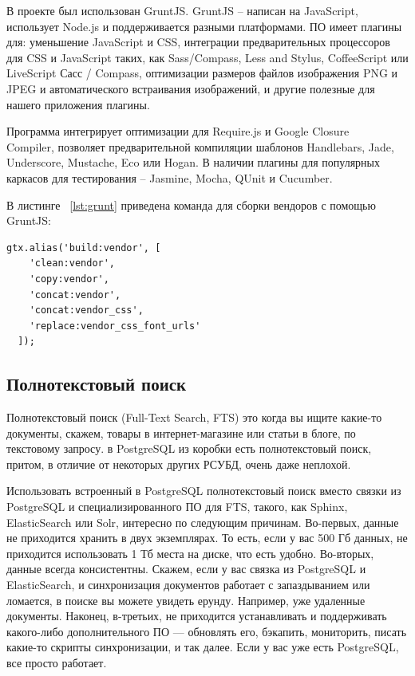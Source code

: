 В проекте был использован GruntJS. GruntJS – написан на JavaScript, использует Node.js
и поддерживается разными платформами. ПО имеет плагины для: уменьшение JavaScript и CSS,
интеграции предварительных процессоров для CSS и JavaScript таких, как Sass/Compass,
Less and Stylus, CoffeeScript или LiveScript Сасс / Compass, оптимизации размеров файлов
изображения PNG и JPEG и автоматического встраивания изображений, и другие полезные
для нашего приложения плагины.

Программа  интегрирует оптимизации для Require.js и
Google Closure\\ Compiler, позволяет предварительной компиляции шаблонов Handlebars,
Jade, Underscore, Mustache, Eco или Hogan. В наличии  плагины для популярных каркасов
для тестирования – Jasmine, Mocha, QUnit и Cucumber.

В листинге ~\ref{lst:grunt} приведена команда для сборки вендоров с помощью GruntJS:
\begin{lstlisting}[caption={Сборка вендоров}, label=lst:grunt]
  gtx.alias('build:vendor', [
    'clean:vendor',
    'copy:vendor',
    'concat:vendor',
    'concat:vendor_css',
    'replace:vendor_css_font_urls'
  ]);
\end{lstlisting}


\subsection{Полнотекстовый поиск}

Полнотекстовый поиск (Full-Text Search, FTS) это когда вы ищите какие-то документы,
скажем, товары в интернет-магазине или статьи в блоге, по текстовому запросу. в PostgreSQL из коробки есть
полнотекстовый поиск, притом, в отличие от некоторых других РСУБД, очень даже неплохой.

Использовать встроенный в PostgreSQL полнотекстовый поиск вместо связки из PostgreSQL и специализированного ПО для FTS,
такого, как Sphinx, ElasticSearch или Solr, интересно по следующим причинам.
Во-первых, данные не приходится хранить в двух экземплярах. То есть, если у вас 500 Гб данных, не приходится использовать
1 Тб места на диске, что есть удобно. Во-вторых, данные всегда консистентны.
Скажем, если у вас связка из PostgreSQL и ElasticSearch, и синхронизация документов работает с запаздыванием
или ломается, в поиске вы можете увидеть ерунду. Например, уже удаленные документы.
Наконец, в-третьих, не приходится устанавливать и поддерживать какого-либо дополнительного ПО —
обновлять его, бэкапить, мониторить, писать какие-то скрипты синхронизации, и так далее.
Если у вас уже есть PostgreSQL, все просто работает.

